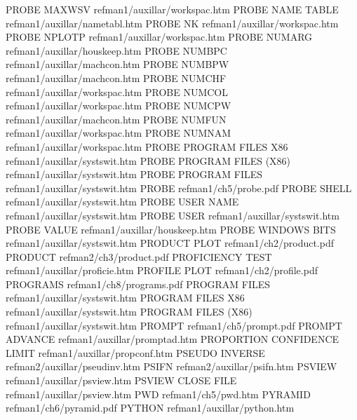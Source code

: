 PROBE MAXWSV                            refman1/auxillar/workspac.htm
PROBE NAME TABLE                        refman1/auxillar/nametabl.htm
PROBE NK                                refman1/auxillar/workspac.htm
PROBE NPLOTP                            refman1/auxillar/workspac.htm
PROBE NUMARG                            refman1/auxillar/houskeep.htm
PROBE NUMBPC                            refman1/auxillar/machcon.htm
PROBE NUMBPW                            refman1/auxillar/machcon.htm
PROBE NUMCHF                            refman1/auxillar/workspac.htm
PROBE NUMCOL                            refman1/auxillar/workspac.htm
PROBE NUMCPW                            refman1/auxillar/machcon.htm
PROBE NUMFUN                            refman1/auxillar/workspac.htm
PROBE NUMNAM                            refman1/auxillar/workspac.htm
PROBE PROGRAM FILES X86                 refman1/auxillar/systswit.htm
PROBE PROGRAM FILES (X86)               refman1/auxillar/systswit.htm
PROBE PROGRAM FILES                     refman1/auxillar/systswit.htm
PROBE                                   refman1/ch5/probe.pdf
PROBE SHELL                             refman1/auxillar/systswit.htm
PROBE USER NAME                         refman1/auxillar/systswit.htm
PROBE USER                              refman1/auxillar/systswit.htm
PROBE VALUE                             refman1/auxillar/houskeep.htm
PROBE WINDOWS BITS                      refman1/auxillar/systswit.htm
PRODUCT PLOT                            refman1/ch2/product.pdf
PRODUCT                                 refman2/ch3/product.pdf
PROFICIENCY TEST                        refman1/auxillar/proficie.htm
PROFILE PLOT                            refman1/ch2/profile.pdf
PROGRAMS                                refman1/ch8/programs.pdf
PROGRAM FILES                           refman1/auxillar/systswit.htm
PROGRAM FILES X86                       refman1/auxillar/systswit.htm
PROGRAM FILES (X86)                     refman1/auxillar/systswit.htm
PROMPT                                  refman1/ch5/prompt.pdf
PROMPT ADVANCE                          refman1/auxillar/promptad.htm
PROPORTION CONFIDENCE LIMIT             refman1/auxillar/propconf.htm
PSEUDO INVERSE                          refman2/auxillar/pseudinv.htm
PSIFN                                   refman2/auxillar/psifn.htm
PSVIEW                                  refman1/auxillar/psview.htm
PSVIEW CLOSE FILE                       refman1/auxillar/psview.htm
PWD                                     refman1/ch5/pwd.htm
PYRAMID                                 refman1/ch6/pyramid.pdf
PYTHON                                  refman1/auxillar/python.htm
